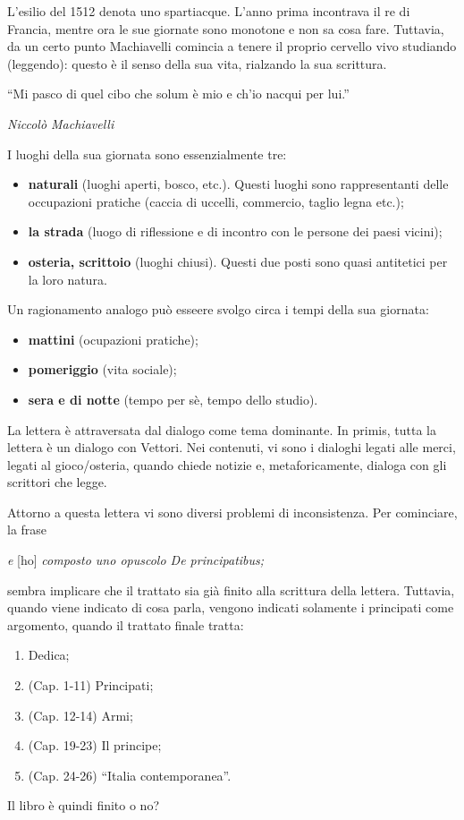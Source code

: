 \documentclass[a4paper]{article}
\newcommand{\quotes}[1]{``#1''}
\begin{document}
L'esilio del 1512 denota uno spartiacque.
L'anno prima incontrava il re di Francia, mentre ora
le sue giornate sono monotone e non sa cosa fare.
Tuttavia, da un certo punto Machiavelli comincia a tenere il proprio cervello vivo
studiando (leggendo): questo è il senso della sua vita,
rialzando la sua scrittura.

\epigraph{``Mi pasco di quel cibo che solum è mio e ch'io nacqui per lui.''}{\textit{Niccolò Machiavelli}}

I luoghi della sua giornata sono essenzialmente tre:
\begin{itemize}
    \item \textbf{naturali} (luoghi aperti, bosco, etc.).
        Questi luoghi sono rappresentanti delle occupazioni pratiche (caccia di uccelli, commercio, taglio legna etc.);
    \item \textbf{la strada} (luogo di riflessione e di incontro con le persone dei paesi vicini);
    \item \textbf{osteria, scrittoio} (luoghi chiusi). Questi due posti sono quasi antitetici per la loro natura.
\end{itemize}

Un ragionamento analogo può esseere svolgo circa i tempi della sua giornata:
\begin{itemize}
    \item \textbf{mattini} (ocupazioni pratiche);
    \item \textbf{pomeriggio} (vita sociale);
    \item \textbf{sera e di notte} (tempo per sè, tempo dello studio).
\end{itemize}

La lettera è attraversata dal dialogo come tema dominante.
In primis, tutta la lettera è un dialogo con Vettori.
Nei contenuti, vi sono i dialoghi legati alle merci, legati al gioco/osteria,
quando chiede notizie e, metaforicamente, dialoga con gli scrittori che legge.



Attorno a questa lettera vi sono diversi problemi di inconsistenza.
Per cominciare, la frase
\begin{center}
    \textit{e} [ho] \textit{composto uno opuscolo De principatibus;}
\end{center}
sembra implicare che il trattato sia già finito alla scrittura della lettera.
Tuttavia, quando viene indicato di cosa parla, vengono indicati solamente
i principati come argomento, quando il trattato finale
tratta:
\begin{enumerate}
    \item Dedica;
    \item (Cap. 1-11) Principati;
    \item (Cap. 12-14) Armi;
    \item (Cap. 19-23) Il principe;
    \item (Cap. 24-26) \quotes{Italia contemporanea}.
\end{enumerate}
Il libro è quindi finito o no?
\end{document}
